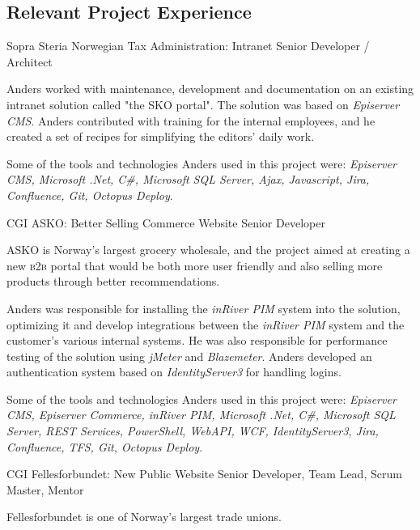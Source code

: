 \documentclass[10pt]{article} %
\begin{document}
\begin{paracol}{2}

\section{Relevant Project Experience}


{Sopra Steria} %
{Norwegian Tax Administration: Intranet} 
{Senior Developer / Architect} 
{Anders worked with maintenance, development and documentation on an existing intranet solution called "the SKO portal". The solution was based on \textit{Episerver CMS}. Anders contributed with training for the internal employees, and he created a set of recipes for simplifying the editors' daily work.

\qquad Some of the tools and technologies Anders used in this project were: \textit{Episerver CMS, Microsoft .Net, C\#, Microsoft SQL Server, Ajax, Javascript, Jira, Confluence, Git, Octopus Deploy}.} 

{CGI} %
{ASKO: Better Selling Commerce Website} 
{Senior Developer} 
{ASKO is Norway's largest grocery wholesale, and the project aimed at creating a new \textsc{b2b} portal that would be both more user friendly and also selling more products through better recommendations.

\qquad Anders was responsible for installing the \textit{inRiver PIM} system into the solution, optimizing it and develop integrations between the \textit{inRiver PIM} system and the customer's various internal systems. He was also responsible for performance testing of
the solution using \textit{jMeter} and \textit{Blazemeter}. Anders developed an authentication system based on \textit{IdentityServer3}
for handling logins.

\qquad Some of the tools and technologies Anders used in this project were: \textit{Episerver CMS, Episerver Commerce, inRiver PIM, Microsoft .Net, C\#, Microsoft SQL Server, REST Services, PowerShell, WebAPI, WCF, IdentityServer3, Jira, Confluence, TFS, Git, Octopus Deploy}.} 


{CGI} 
{Fellesforbundet: New Public Website} 
{Senior Developer, Team Lead, Scrum Master, Mentor} 
{Fellesforbundet is one of Norway's largest trade unions.

}
\end{paracol}
\end{document}

